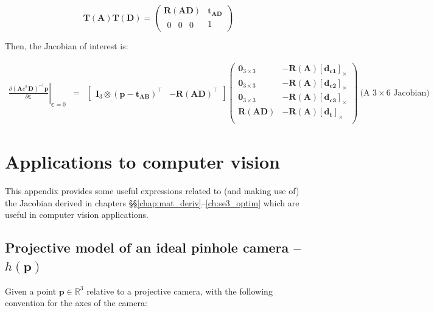 \documentclass[a4paper,11pt]{report}
\newcommand{\E}{{\bm{\varepsilon}}}
\newcommand{\A}{{\mathbf{A}}}
\newcommand{\D}{{\mathbf{D}}}
\newcommand{\I}{{\mathbf{I}}}
\begin{document}
\begin{equation}
\mathbf{T}(\A) \mathbf{T}(\D)
= 
\left(
\begin{array}{c|c}
 \mathbf{R}(\A\D) & \mathbf{t_{AD}} \\
\hline 
 \begin{array}{ccc} 0 & 0 & 0 \end{array} & 1
\end{array}
\right)
\end{equation}

Then, the Jacobian of interest is:

\begin{eqnarray}
\left. \frac{\partial (\A e^\E \D)^{-1} \mathbf{p}}{\partial \E} \right|_{\E = 0}
&=&
\left[
\begin{array}{cc}
 \I_3 \otimes (\mathbf{p}-\mathbf{t_{AB}})^\top  & -\mathbf{R}(\A\D)^\top
\end{array}
\right]
\left(
\begin{array}{cc}
 \mathbf{0}_{3\times 3}  & -\mathbf{R}(\A) [\mathbf{d_{c1}}]_\times \\
 \mathbf{0}_{3\times 3}  & -\mathbf{R}(\A) [\mathbf{d_{c2}}]_\times \\
 \mathbf{0}_{3\times 3}  & -\mathbf{R}(\A) [\mathbf{d_{c3}}]_\times \\
 \mathbf{R}(\A\D)        & -\mathbf{R}(\A) [\mathbf{d_{t}}]_\times \\
\end{array}
\right)
~ \text{(A $3 \times 6$ Jacobian)} \nonumber
\end{eqnarray}



\appendix

\chapter{Applications to computer vision}
\label{ch:apx:cv}

This appendix provides some useful expressions related to (and making use of) 
the Jacobian derived in chapters \S\S\ref{chap:mat_deriv}--\ref{ch:se3_optim} 
which are useful
in computer vision applications.


\section{Projective model of an ideal pinhole camera -- $h(\mathbf{p})$}

Given a point $\mathbf{p} \in \mathbb{R}^3$ relative to a 
projective camera, with the following convention for the axes of the 
camera:
\end{document}
